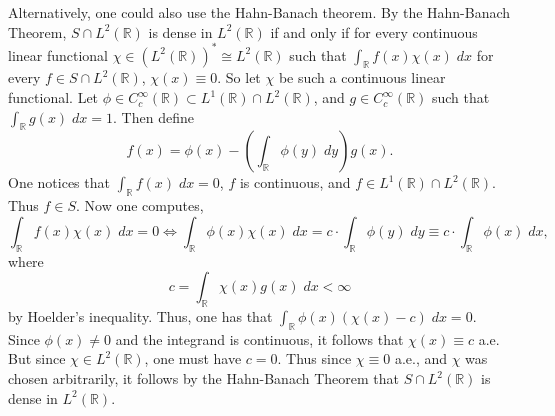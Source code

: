 \documentclass{article}
\begin{document}
\begin{enumerate}[itemsep =-2pt,label = (\arabic{*})]
		Alternatively, one could also use the Hahn-Banach theorem. By the Hahn-Banach Theorem, $S \cap L^{2}(\mathbb{R})$ is dense in $L^{2}(\mathbb{R})$ if and only if for every continuous linear functional $\chi \in (L^{2}(\mathbb{R}))^{\ast} \cong L^{2}(\mathbb{R})$ such that $\int_{\mathbb{R}}f(x)\chi(x)\;dx$ for every $f \in S \cap L^{2}(\mathbb{R})$, $\chi(x) \equiv 0$. So let $\chi$ be such a continuous linear functional. Let $\phi \in C_{c}^{\infty}(\mathbb{R}) \subset L^{1}(\mathbb{R}) \cap L^{2}(\mathbb{R})$, and $g \in C_{c}^{\infty}(\mathbb{R})$ such that $\int_{\mathbb{R}}g(x)\;dx = 1$. Then define 
		\begin{equation*}
			f(x) = \phi(x) - \left(\int_{\mathbb{R}}\phi(y)\;dy\right)g(x). 
		\end{equation*}
		One notices that $\int_{\mathbb{R}}f(x)\;dx = 0$, $f$ is continuous, and $f \in L^{1}(\mathbb{R}) \cap L^{2}(\mathbb{R})$. Thus $f \in S$. Now one computes, 
		\begin{equation*}
			\int_{\mathbb{R}}f(x)\chi(x)\;dx = 0 \iff \int_{\mathbb{R}}\phi(x)\chi(x)\;dx = c \cdot \int_{\mathbb{R}}\phi(y)\;dy \equiv c \cdot \int_{\mathbb{R}}\phi(x)\;dx, 
		\end{equation*}
		where 
		\begin{equation*}
			c = \int_{\mathbb{R}}\chi(x)g(x)\;dx < \infty 
		\end{equation*}
		by Hoelder's inequality. Thus, one has that $\int_{\mathbb{R}}\phi(x)(\chi(x) - c)\;dx = 0$. Since $\phi(x) \neq 0$ and the integrand is continuous, it follows that $\chi(x) \equiv c$ a.e. But since $\chi \in L^{2}(\mathbb{R})$, one must have $c = 0$. Thus since $\chi \equiv 0$ a.e., and $\chi$ was chosen arbitrarily, it follows by the Hahn-Banach Theorem that $S \cap L^{2}(\mathbb{R})$ is dense in $L^{2}(\mathbb{R})$. 
	\end{enumerate}
	
\end{document}

